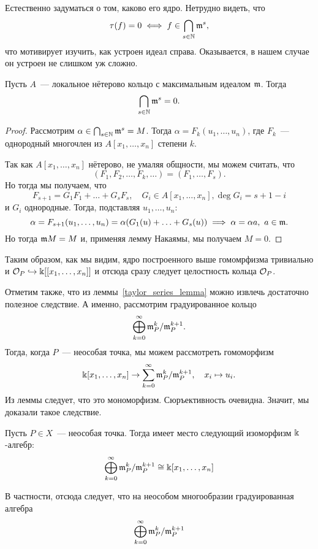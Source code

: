 	Естественно задуматься о том, каково его ядро. Нетрудно видеть, что 
	\[
		\tau(f) = 0 \iff f \in \bigcap_{s \in \mathbb{N}} \mathfrak{m}^s,
	\]
	что мотивирует изучить, как устроен идеал справа. Оказывается, в нашем случае он устроен не слишком уж сложно. 

	\begin{theorem} 
		Пусть $A$~--- локальное нётерово кольцо с максимальным идеалом $\mathfrak{m}$. Тогда 
		\[
			\bigcap_{s \in \mathbb{N}} \mathfrak{m}^s = 0.
		\]
	\end{theorem}
	\begin{proof}
		Рассмотрим $\alpha \in \bigcap_{s \in \mathbb{N}} \mathfrak{m}^s = M$.  Тогда $\alpha = F_k(u_1, \ldots, u_n)$, где $F_k$~--- однородный многочлен из $A[x_1, \ldots, x_n]$ степени $k$.

		Так как $A[x_1, \ldots, x_n]$ нётерово, не умаляя общности, мы можем считать, что 
		\[
			(F_1, F_2, \ldots, F_k, \ldots) = (F_1, \ldots, F_s).
		\]
		Но тогда мы получаем, что 
		\[
			F_{s + 1} = G_1 F_1 + \ldots + G_s F_s, \quad G_i \in A[x_1, \ldots, x_n], \deg{G_i} = s + 1 - i
		\]
		и $G_i$ однородные. Тогда, подставляя $u_1, \ldots, u_n$:
		\[
			\alpha = F_{s + 1}(u_1, \ldots, u_n) = \alpha(G_1(u) + \ldots + G_s(u)) \implies \alpha = \alpha a, \ a \in \mathfrak{m}.
		\]
		Но тогда $\mathfrak{m} M = M$ и, применяя лемму Накаямы, мы получаем $M = 0$.
	\end{proof}

	Таким образом, как мы видим, ядро построенного выше гомомрфизма тривиально и $\mathcal{O}_P \hookrightarrow \Bbbk[[x_1, \ldots, x_n]]$ и отсюда сразу следует целостность кольца $\mathcal{O}_P$. 

	Отметим также, что из леммы~\ref{taylor_series_lemma}  можно извлечь достаточно полезное следствие. А именно, рассмотрим градуированное кольцо 
	\[
		\bigoplus_{k = 0}^{\infty} \mathfrak{m}_P^k/\mathfrak{m}_P^{k + 1}.
	\]
	Тогда, когда $P$~--- неособая точка, мы можем рассмотреть гомоморфизм 
	\[
		\Bbbk[x_1, \ldots, x_n] \to \sum_{k = 0}^{\infty} \mathfrak{m}_P^k/\mathfrak{m}_P^{k + 1}, \quad x_i \mapsto u_i.
	\]
	Из леммы следует, что это мономорфизм. Сюръективность очевидна. Значит, мы доказали такое следствие. 

	\begin{corollary}
		Пусть $P \in X$~--- неособая точка. Тогда имеет место следующий изоморфизм $\Bbbk$-алгебр: 
		\[
			\bigoplus_{k = 0}^{\infty} \mathfrak{m}_P^k/\mathfrak{m}_P^{k + 1} \cong \Bbbk[x_1, \ldots, x_n]
		\]
	\end{corollary}

	В частности, отсюда следует, что на неособом многообразии градуированная алгебра 
	\[
	 	\bigoplus_{k = 0}^{\infty} \mathfrak{m}_P^k/\mathfrak{m}_P^{k + 1}
	 \] 

